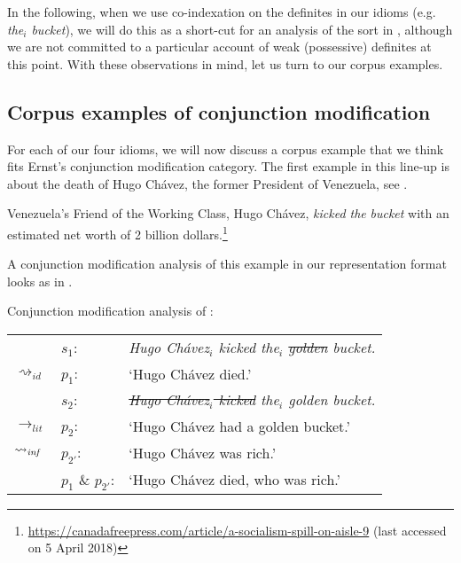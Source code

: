 \documentclass[output=paper]{langsci/langscibook}
\begin{document}
\noindent In the following, when we use co-indexation on the definites in our idioms (e.g. \textit{the$_i$ bucket}), we will do this as a short-cut for an analysis of the sort in , although we are not committed to a particular account of weak (possessive) definites at this point. With these observations in mind, let us turn to our corpus examples.



\subsection{Corpus examples of conjunction modification} \label{clear cases}\largerpage[-1]

For each of our four idioms, we will now discuss a corpus example that we think fits Ernst's conjunction modification category. The first example in this line-up is about the death of Hugo Ch\'avez, the former President of Venezuela, see .

\ea \label{golden bucket}
Venezuela's Friend of the Working Class, Hugo Ch\'avez, \textit{kicked the} \underline{} \textit{bucket} with an estimated net worth of 2 billion dollars.\footnote{\url{https://canadafreepress.com/article/a-socialism-spill-on-aisle-9} (last accessed on 5 April 2018)}
\z

\noindent A conjunction modification analysis of this example in our representation format looks as in .

\ea \label{analysis golden bucket} 
Conjunction modification analysis of :\smallskip\\
\begin{tabularx}{\linewidth}[t]{@{}llQ@{}}      
                         & 	$s_{1}$: & \textit{Hugo Ch\'avez$_{i}$ kicked the$_{i}$ \sout{golden} bucket.} \\
$\rightsquigarrow_{id}$ &	$p_{1}$: & `Hugo Ch\'avez died.' \medskip\\
  & 	$s_{2}$: & \textit{\sout{Hugo Ch\'avez$_{i}$ kicked} the$_{i}$ golden bucket.} \\
$\rightarrow_{lit}$	 &	$p_{2}$: & `Hugo Ch\'avez had a golden bucket.' \\
$\rightsquigarrow_{\text{\itshape inf}}$	&	$p_{2'}$: &  `Hugo Ch\'avez was rich.' \medskip\\
								&	$p_{1}$ \& $p_{2'}$: & `Hugo Ch\'avez died, who was rich.'
\end{tabularx}
\z
\end{document}
